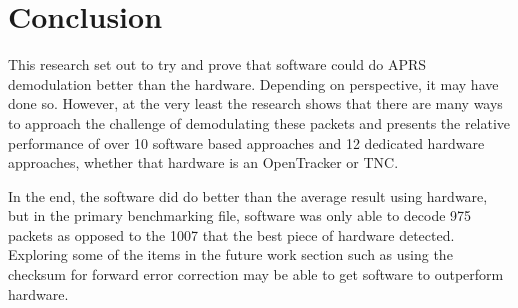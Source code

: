 \chapter{Conclusion}
This research set out to try and prove that software could do APRS demodulation better than the hardware. Depending on perspective, it may have done so. However, at the very least the research shows that there are many ways to approach the challenge of demodulating these packets and presents the relative performance of over 10 software based approaches and 12 dedicated hardware approaches, whether that hardware is an OpenTracker or TNC.

In the end, the software did do better than the average result using hardware, but in the primary benchmarking file, software was only able to decode 975 packets as opposed to the 1007 that the best piece of hardware detected. Exploring some of the items in the future work section such as using the checksum for forward error correction may be able to get software to outperform hardware.